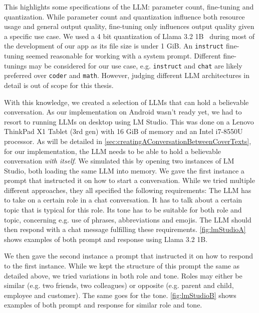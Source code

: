 This highlights some specifications of the \gls{LLM}: parameter count, fine-tuning and quantization. While parameter count and quantization influence both resource usage and general output quality, fine-tuning only influences output quality given a specific use case. We used a 4 bit quantization of Llama 3.2 1B~\cite{huggingquantsHuggingquantsLlama321BInstructQ4_K_MGGUFHugging2024} during most of the development of our app as its file size is under 1 GiB. An \lstinline|instruct| fine-tuning seemed reasonable for working with a system prompt. Different fine-tunings may be considered for our use case, e.g. \lstinline|instruct| and \lstinline|chat| are likely preferred over \lstinline|coder| and \lstinline|math|. However, judging different \gls{LLM} architectures in detail is out of scope for this thesis.

With this knowledge, we created a selection of \glspl{LLM} that can hold a believable conversation. As our implementation on Android wasn't ready yet, we had to resort to running \glspl{LLM} on desktop using LM Studio. This was done on a Lenovo ThinkPad X1 Tablet (3rd gen) with 16 GiB of memory and an Intel i7-8550U processor. As will be detailed in \cref{sec:creatingAConversationBetweenCoverTexts}, for our implementation, the \gls{LLM} needs to be able to hold a believable conversation \textit{with itself}. We simulated this by opening two instances of LM Studio, both loading the same \gls{LLM} into memory. We gave the first instance a prompt that instructed it on how to start a conversation. While we tried multiple different approaches, they all specified the following requirements: The \gls{LLM} has to take on a certain role in a chat conversation. It has to talk about a certain topic that is typical for this role. Its tone has to be suitable for both role and topic, concerning e.g. use of phrases, abbreviations and emojis. The \gls{LLM} should then respond with a chat message fulfilling these requirements. \cref{fig:lmStudioA} shows examples of both prompt and response using Llama 3.2 1B.

We then gave the second instance a prompt that instructed it on how to respond to the first instance. While we kept the structure of this prompt the same as detailed above, we tried variations in both role and tone. Roles may either be similar (e.g. two friends, two colleagues) or opposite (e.g. parent and child, employee and customer). The same goes for the tone. \cref{fig:lmStudioB} shows examples of both prompt and response for similar role and tone.

